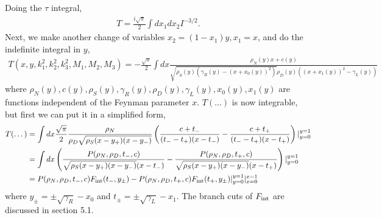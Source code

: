 \documentclass[twoside]{article}
\begin{document}
Doing the $\tau$ integral,
\begin{align}
  T = \frac{i\sqrt{\pi}}{2}\int dx_1 dx_2I^{-3/2}.
\end{align}
Next, we make another change of variables $x_2  = (1 - x_1)y, x_1 = x$, and do the indefinite integral in $y$,
\begin{align}
  T(x, y, k^2_1, k^2_2, k^2_3, M_1, M_2, M_3) = -\frac{\sqrt{\pi}}{2}\int dx \frac{\rho_N(y) x + c(y)}{\sqrt{\rho_S(y)\left( \gamma_R(y) - (x + x_0(y))^2
  \right)}\rho_D(y)\left( (x + x_1(y))^2 - \gamma_L(y) \right)}
\end{align}
where $\rho_N(y), c(y), \rho_S(y), \gamma_R(y), \rho_D(y), \gamma_L(y), x_0(y), x_1(y)$ are functions independent of the Feynman parameter
$x$. $T(\dots)$ is now integrable, but first we can put it in a simplified form,
\begin{align}
  T(\dots) &=  \int dx \frac{\sqrt{\pi}}{2}\frac{\rho_N}{\rho_D\sqrt{\rho_S(x-y_+)(x - y_-)}}\left( \frac{c + t_-}{(t_- - t_+)(x - t_-)} -
  \frac{c + t_+}{(t_- - t_+)(x - t_+)} \right) \vert^{y = 1}_{y = 0}\\
  &= \int dx \left( \frac{P(\rho_N, \rho_D,  t_{-}, c)}{\sqrt{\rho_S(x - y_+)(x - y_-)}(x - t_-)} - \frac{P(\rho_N, \rho_D,  t_{+}, c)}{\sqrt{\rho_S(x -
  y_+)(x - y_-)}(x - t_+)} \right)\vert^{y = 1}_{y = 0}\\
  &= P(\rho_N,\rho_D,t_-,c)F_{\rm int}(t_-, y_{\pm}) - P(\rho_N,\rho_D,t_+,c)F_{\rm int}(t_+, y_{\pm})\vert^{y = 1}_{y = 0}\vert^{x =
  1}_{x = 0}
\end{align}
where $y_{\pm} = \pm \sqrt{\gamma_R}-x_0$ and $t_{\pm} = \pm \sqrt{\gamma_L} - x_1$. The branch cuts of $F_{\rm int}$ are discussed in
section 5.1.
\end{document}
